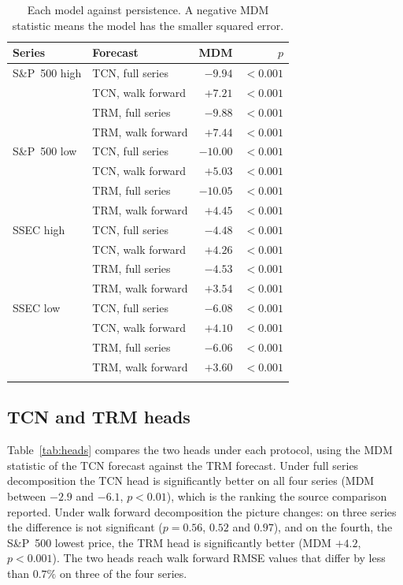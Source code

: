 \documentclass[pdflatex,sn-mathphys-num]{sn-jnl}%
\theoremstyle{thmstyleone}%
\theoremstyle{thmstyletwo}%
\theoremstyle{thmstylethree}%
\begin{document}
\begin{table}[ht]
\caption{Each model against persistence. A negative MDM statistic means the model has the smaller squared error.}
\label{tab:dm}
\centering
\begin{tabular}{@{}llrr@{}}
\toprule
Series & Forecast & MDM & $p$ \\
\midrule
S\&P~500 high & TCN, full series & ${-}9.94$ & $<0.001$ \\
 & TCN, walk forward & ${+}7.21$ & $<0.001$ \\
 & TRM, full series & ${-}9.88$ & $<0.001$ \\
 & TRM, walk forward & ${+}7.44$ & $<0.001$ \\
S\&P~500 low & TCN, full series & ${-}10.00$ & $<0.001$ \\
 & TCN, walk forward & ${+}5.03$ & $<0.001$ \\
 & TRM, full series & ${-}10.05$ & $<0.001$ \\
 & TRM, walk forward & ${+}4.45$ & $<0.001$ \\
SSEC high & TCN, full series & ${-}4.48$ & $<0.001$ \\
 & TCN, walk forward & ${+}4.26$ & $<0.001$ \\
 & TRM, full series & ${-}4.53$ & $<0.001$ \\
 & TRM, walk forward & ${+}3.54$ & $<0.001$ \\
SSEC low & TCN, full series & ${-}6.08$ & $<0.001$ \\
 & TCN, walk forward & ${+}4.10$ & $<0.001$ \\
 & TRM, full series & ${-}6.06$ & $<0.001$ \\
 & TRM, walk forward & ${+}3.60$ & $<0.001$ \\
\botrule
\end{tabular}
\end{table}

\subsection{TCN and TRM heads}
Table~\ref{tab:heads} compares the two heads under each protocol, using the
MDM statistic of the TCN forecast against the TRM forecast. Under full series
decomposition the TCN head is significantly better on all four series (MDM
between $-2.9$ and $-6.1$, $p<0.01$), which is the ranking the source
comparison reported. Under walk forward decomposition the picture changes: on
three series the difference is not significant ($p=0.56$, $0.52$ and $0.97$),
and on the fourth, the S\&P~500 lowest price, the TRM head is significantly
better (MDM $+4.2$, $p<0.001$). The two heads reach walk forward RMSE values
that differ by less than $0.7\%$ on three of the four series.
\end{document}
